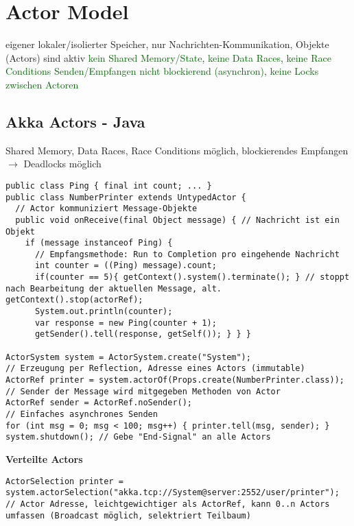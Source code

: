 \section{Actor Model}
eigener lokaler/isolierter Speicher, nur Nachrichten-Kommunikation, Objekte (Actors) sind aktiv \textcolor{darkGreen}{kein Shared Memory/State}, \textcolor{darkGreen}{keine Data Races}, \textcolor{darkGreen}{keine Race Conditions} \textcolor{darkGreen}{Senden/Empfangen nicht blockierend (asynchron)}, \textcolor{darkGreen}{keine Locks zwischen Actoren}

\subsection{Akka Actors - Java}
Shared Memory, Data Races, Race Conditions möglich, blockierendes Empfangen $\rightarrow$ Deadlocks möglich

\begin{lstlisting}
public class Ping { final int count; ... }
public class NumberPrinter extends UntypedActor {
  // Actor kommuniziert Message-Objekte
  public void onReceive(final Object message) { // Nachricht ist ein Objekt
  	if (message instanceof Ping) {
      // Empfangsmethode: Run to Completion pro eingehende Nachricht
  	  int counter = ((Ping) message).count;
  	  if(counter == 5){ getContext().system().terminate(); } // stoppt nach Bearbeitung der aktuellen Message, alt. getContext().stop(actorRef);
      System.out.println(counter);
      var response = new Ping(counter + 1);
      getSender().tell(response, getSelf()); } } }

ActorSystem system = ActorSystem.create("System");
// Erzeugung per Reflection, Adresse eines Actors (immutable)
ActorRef printer = system.actorOf(Props.create(NumberPrinter.class));
// Sender der Message wird mitgegeben Methoden von Actor
ActorRef sender = ActorRef.noSender();
// Einfaches asynchrones Senden
for (int msg = 0; msg < 100; msg++) { printer.tell(msg, sender); }
system.shutdown(); // Gebe "End-Signal" an alle Actors
\end{lstlisting}

\textbf{Verteilte Actors}

\begin{lstlisting}
ActorSelection printer = system.actorSelection("akka.tcp://System@server:2552/user/printer"); // Actor Adresse, leichtgewichtiger als ActorRef, kann 0..n Actors umfassen (Broadcast möglich, selektriert Teilbaum)
\end{lstlisting}
